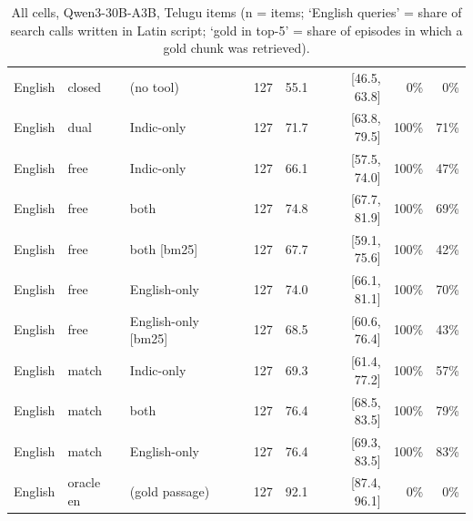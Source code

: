 \begin{table}[htbp]
\begin{tabular}{lllrrrrr}
English & closed & (no tool) & 127 & 55.1 & [46.5, 63.8] & 0\% & 0\% \\
English & dual & Indic-only & 127 & 71.7 & [63.8, 79.5] & 100\% & 71\% \\
English & free & Indic-only & 127 & 66.1 & [57.5, 74.0] & 100\% & 47\% \\
English & free & both & 127 & 74.8 & [67.7, 81.9] & 100\% & 69\% \\
English & free & both [bm25] & 127 & 67.7 & [59.1, 75.6] & 100\% & 42\% \\
English & free & English-only & 127 & 74.0 & [66.1, 81.1] & 100\% & 70\% \\
English & free & English-only [bm25] & 127 & 68.5 & [60.6, 76.4] & 100\% & 43\% \\
English & match & Indic-only & 127 & 69.3 & [61.4, 77.2] & 100\% & 57\% \\
English & match & both & 127 & 76.4 & [68.5, 83.5] & 100\% & 79\% \\
English & match & English-only & 127 & 76.4 & [69.3, 83.5] & 100\% & 83\% \\
English & oracle en & (gold passage) & 127 & 92.1 & [87.4, 96.1] & 0\% & 0\% \\
\bottomrule
\end{tabular}
\caption{All cells, Qwen3-30B-A3B, Telugu items (n = items; `English queries' = share of search calls written in Latin script; `gold in top-5' = share of episodes in which a gold chunk was retrieved).}
\end{table}
